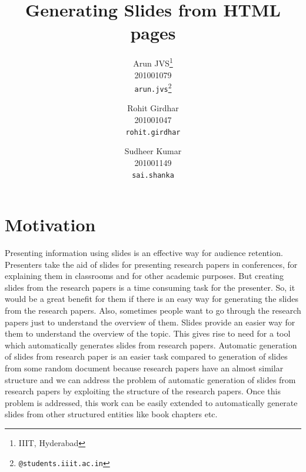 \documentclass[10pt,twocolumn,letterpaper]{article}
\newcommand*\samethanks[1][\value{footnote}]{\footnotemark[#1]}
\begin{document}
\title{Generating Slides from HTML pages}

\author{Arun JVS\thanks{IIIT, Hyderabad}\\
201001079\\
{\tt\small arun.jvs\thanks{@students.iiit.ac.in}}
\and
Rohit Girdhar\samethanks[1]\\
201001047\\
{\tt\small rohit.girdhar\samethanks[2] }
\and
Sudheer Kumar\samethanks[1]\\
201001149\\
{\tt\small sai.shanka\samethanks[2] }
}

\maketitle

\begin{abstract}
    
\end{abstract}

\section{Motivation}

Presenting information using slides is an effective way for audience retention.
Presenters take the aid of slides for presenting research papers in conferences, for
explaining them in classrooms and for other academic purposes. But creating slides from
the research papers is a time consuming task for the presenter. So, it would be a great
benefit for them if there is an easy way for generating the slides from the research
papers. Also, sometimes people want to go through the research papers just to understand
the overview of them. Slides provide an easier way for them to understand the overview of
the topic. This gives rise to need for a tool which automatically generates slides from
research papers. Automatic generation of slides from research paper is an easier task
compared to generation of slides from some random document because research papers have
an almost similar structure and we can address the problem of automatic generation of slides
from research papers by exploiting the structure of the research papers. Once this problem
is addressed, this work can be easily extended to automatically generate slides from other
structured entities like book chapters etc.
\end{document}
